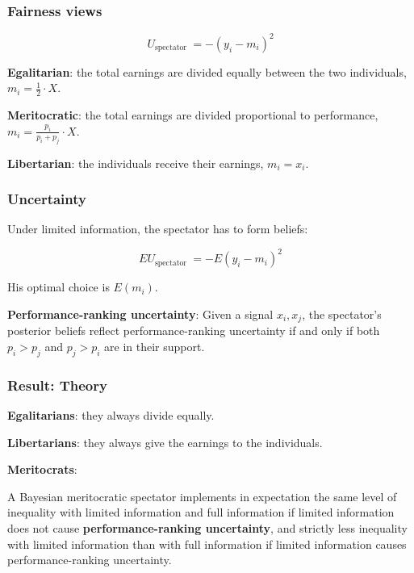\documentclass[usenames,dvipsnames,aspectratio=169,11pt, envcountsect]{beamer}
\begin{document}
\begin{frame}\frametitle{Fairness views}

	\[
		U_{\text {spectator }}=- \left(y_i-m_i \right)^2
	\]

	\vfill

	\textbf{Egalitarian}: the total earnings are divided equally between the two individuals, \( m_i=\frac{1}{2} \cdot X \).

	\vfill

	\textbf{Meritocratic}: the total earnings are divided proportional to performance, \( m_i=\frac{p_i}{p_i+p_j} \cdot X \).

	\vfill

	\textbf{Libertarian}: the individuals receive their earnings, \( m_i=x_i \).
\end{frame}


\begin{frame}\frametitle{Uncertainty}

	Under limited information, the spectator has to form beliefs:

	\vfill

	\[
		E U_{\text {spectator }}=-E\left(y_i-m_i\right)^2
	\]

	\vfill

	His optimal choice is \( E\left( m_i \right) \).

	\vfill

	\textbf{Performance-ranking uncertainty}: Given a signal \( x_i, x_j \), the spectator's posterior beliefs reflect performance-ranking uncertainty if and only if both \( p_i > p_j \) and \( p_j > p_i \) are in their support.
\end{frame}

\begin{frame}\frametitle{Result: Theory}

	\textbf{Egalitarians}: they always divide equally.

	\vfill

	\textbf{Libertarians}: they always give the earnings to the individuals.

	\vfill

	\textbf{Meritocrats}:

	\vfill

	\begin{prop}
		A Bayesian meritocratic spectator implements in expectation
		the same level of inequality with limited information and full information
		if limited information does not cause \textbf{performance-ranking uncertainty}, and strictly less inequality with limited information than with full information if limited information causes performance-ranking uncertainty.
	\end{prop}

\end{frame}
\end{document}
